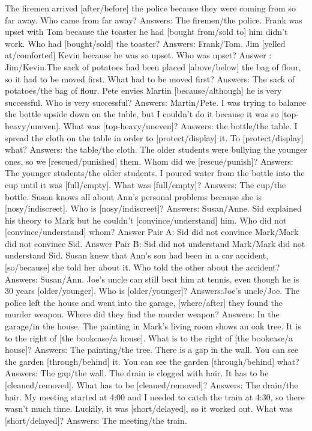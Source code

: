 \begin{foo}
The firemen arrived [after/before] the police because they were coming from so far away. Who came from far away? Answers: The firemen/the police.
Frank was upset with Tom because the toaster he had [bought from/sold to] him didn't work. Who had [bought/sold] the toaster? Answers: Frank/Tom.
Jim [yelled at/comforted] Kevin because he was so upset. Who was upset?
Answer  : Jim/Kevin.The sack of potatoes had been placed [above/below] the bag of flour, so it had to be moved first. What had to be moved first? Answers: The sack of potatoes/the bag  of flour.
Pete envies Martin [because/although] he is very successful. Who is very successful? Answers: Martin/Pete. 
I was trying to balance the bottle upside down on the table, but I couldn't do it because it was so [top-heavy/uneven]. What was [top-heavy/uneven]? Answers: the bottle/the table.
I spread the cloth on the table in order to [protect/display] it. To [protect/display] what? Answers: the table/the cloth.
The older students were bullying the younger ones, so we [rescued/punished] them. Whom did we [rescue/punish]? Answers: The younger students/the older students.
I poured water from the bottle into the cup until it was [full/empty]. What was [full/empty]? Answers: The cup/the bottle.
Susan knows all about Ann's personal problems because she is [nosy/indiscreet]. Who is [nosy/indiscreet]? Answers: Susan/Anne.
Sid explained his theory to Mark but he couldn't [convince/understand] him. Who did not [convince/understand] whom? Answer Pair A: Sid did not convince Mark/Mark did  not convince Sid. Answer Pair B:  Sid did not understand Mark/Mark did not understand  Sid.
Susan knew that Ann's son had been in a car accident, [so/because] she told her about it. Who told the other about the accident? Answers: Susan/Ann.
Joe's uncle can still beat him at tennis, even though he is 30 years [older/younger]. Who is [older/younger]? Answers:Joe's uncle/Joe.
The police left the house and went into the garage, [where/after] they found the murder weapon. Where did they find the murder weapon? Answers: In the garage/in the house.
The painting in Mark's living room shows an oak tree. It is to the right of [the bookcase/a house]. What is to the right of [the bookcase/a house]? Answers: The painting/the tree.
There is a gap in the wall. You can see the garden [through/behind] it. You can see the garden [through/behind] what? Answers: The gap/the wall.
The drain is clogged with hair. It has to be [cleaned/removed]. What has to be [cleaned/removed]? Answers: The drain/the hair.
My meeting started at 4:00 and I needed to catch the train at 4:30, so there wasn't much time. Luckily, it was [short/delayed], so it worked out. What was [short/delayed]? Answers: The meeting/the train.

\end{foo}
